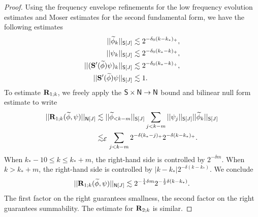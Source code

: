 \begin{proof}
	Using the frequency envelope refinements for the low frequency evolution estimates and Moser estimates for the second fundamental form, we have the following estimates
		\begin{align}
			||\widetilde \phi_k||_{\mathsf S[J]}
				&\lesssim 2^{-\delta_0 (k - k_*)_+},\\
			||\psi_k||_{\mathsf S[J]}
				&\lesssim 2^{-\delta_0 (k_* - k)_+},\\	
			||({\bf S}' (\widetilde \phi)\psi)_k||_{\mathsf S[J]}
				&\lesssim 2^{-\delta_0 (k_* - k)_+},\\
			||{\bf S}' (\widetilde \phi)\psi||_{\mathsf S[J]}
				&\lesssim 1.		
		\end{align}	
	To estimate ${\bf R}_{1;k}$, we freely apply the $\mathsf S \times \mathsf N \to \mathsf N$ bound and bilinear null form estimate to write 
		\begin{align*}
			||{\bf R}_{1;k}(\widetilde\phi, \psi)||_{\mathsf N[J]}
				&\lesssim ||\widetilde \phi_{< k - m}||_{\mathsf S[J]} \sum_{j < k - m} ||\psi_j||_{\mathsf S[J]} ||\widetilde\phi_k||_{\mathsf S[J]}\\
				&\lesssim_\mathcal E \sum_{j < k - m} 2^{-\delta (k_* - j)_+} 2^{-\delta( k - k_*)_+}.
		\end{align*}	
	When $k_* - 10 \leq k \leq k_* + m$, the right-hand side is controlled by $2^{-\delta m}$. When $k > k_* + m$, the right-hand side is controlled by $|k - k_*| 2^{-\delta (k - k_*)}$. We conclude
		\[
			||{\bf R}_{1;k}(\widetilde\phi, \psi)||_{\mathsf N[J]}
				\lesssim 2^{-\frac14 \delta m} 2^{-\frac12\delta (k - k_*)}.
		\]
	The first factor on the right guarantees smallness, the second factor on the right guarantees summability. The estimate for ${\bf R}_{2;k}$ is similar. 
\end{proof}